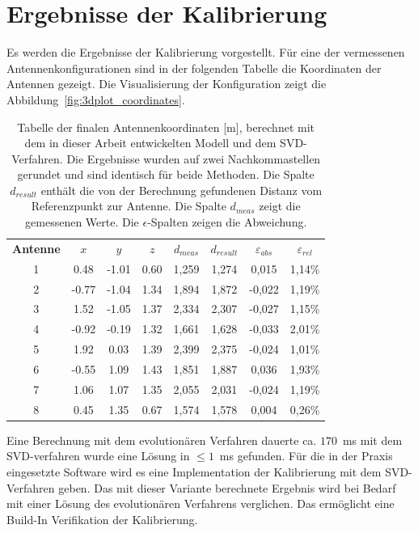 %
\section{Ergebnisse der Kalibrierung}
\label{sec:calibrationResults}
%
Es werden die Ergebnisse der Kalibrierung vorgestellt. Für eine der vermessenen Antennenkonfigurationen sind in der folgenden Tabelle die Koordinaten der Antennen gezeigt. Die Visualisierung der Konfiguration zeigt die Abbildung~\ref{fig:3dplot_coordinates}.
%
\begin{table} [ht!]
	\begin{center}
		\begin{tabular}{cccccccc}
		      \textbf{Antenne} & \textbf{$x$} & \textbf{$y$} & \textbf{$z$} & \textbf{$d_{meas}$} & \textbf{$d_{result}$}& \textbf{$\varepsilon_{abs}$} & \textbf{$\varepsilon_{rel}$} \\
		      1 & 0.48		& -1.01	& 0.60 & 1,259 & 1,274& 0,015 & 1,14\% \\
		      2 & -0.77 	& -1.04 	& 1.34 & 1,894 & 1,872 & -0,022 & 1,19\% \\
		      3 & 1.52  	& -1.05 	& 1.37 & 2,334 & 2,307 & -0,027 & 1,15\% \\
		      4 & -0.92 	& -0.19 	& 1.32 & 1,661 & 1,628 & -0,033 & 2,01\% \\
		      5 & 1.92 		&  0.03 	& 1.39 & 2,399 & 2,375 & -0,024 & 1,01\% \\
		      6 & -0.55 	&  1.09 	& 1.43 & 1,851 & 1,887 & 0,036 & 1,93\% \\
		      7 & 1.06 		&  1.07 	& 1.35 & 2,055 & 2,031 & -0,024 & 1,19\% \\
		      8 & 0.45 		&  1.35 	& 0.67 & 1,574 & 1,578 & 0,004 & 0,26\% \\					
%
		\end{tabular}
		\caption[Finale Antennen Koordinaten]{Tabelle der finalen Antennenkoordinaten [m], berechnet mit dem in dieser Arbeit entwickelten Modell und dem SVD-Verfahren. Die Ergebnisse wurden auf zwei Nachkommastellen gerundet und sind identisch für beide Methoden. Die Spalte $d_{result}$ enthält die von der Berechnung gefundenen Distanz vom Referenzpunkt zur Antenne. Die Spalte $d_{meas}$ zeigt die gemessenen Werte. Die $\epsilon$-Spalten zeigen die Abweichung.}
		\label{tab:FinalCoords}
	\end{center}
\end{table}
%
Eine Berechnung mit dem evolutionären Verfahren dauerte ca. $170$~ms mit dem SVD-verfahren wurde eine Lösung in $\le 1$~ms gefunden. Für die in der Praxis eingesetzte Software wird es eine Implementation der Kalibrierung mit dem SVD-Verfahren geben. Das mit dieser Variante berechnete Ergebnis wird bei Bedarf mit einer Lösung des evolutionären Verfahrens verglichen. Das ermöglicht eine Build-In Verifikation der Kalibrierung.\\

